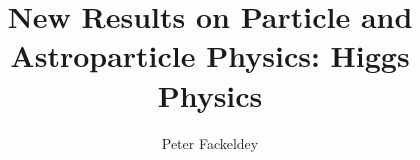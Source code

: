 \documentclass[a4paper,10pt,twoside,hyperpdf,fleqn]{hepthesis}
\title{New Results on Particle and Astroparticle Physics: Higgs Physics}
\author{Peter Fackeldey}
\begin{document}
\begin{frontmatter}
  
\end{frontmatter}

\begin{mainmatter}

  
  
\end{mainmatter}




\end{document}

